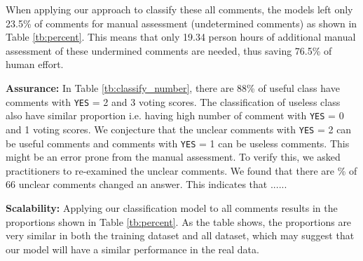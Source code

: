 When applying our approach to classify these all comments, the models left only 23.5\% of comments for manual assessment (undetermined comments) as shown in Table \ref{tb:percent}.
This means that only 19.34 person hours of additional manual assessment of these undermined comments are needed, thus saving 76.5\% of human effort.

%
%
%

\textbf{Assurance:} In Table \ref{tb:classify_number}, there are 88\% of useful class have comments with \texttt{YES} = 2 and 3 voting scores. The classification of useless class also have similar proportion i.e. having high number of comment with \texttt{YES} = 0 and 1 voting scores. We conjecture that the unclear comments with \texttt{YES} = 2 can be useful comments and comments with \texttt{YES} = 1 can be useless comments. This might be an error prone from the manual assessment. To verify this, we asked practitioners to re-examined the unclear comments. We found that there are \% of 66 unclear comments changed an answer. This indicates that ......




\textbf{Scalability:} Applying our classification model to all comments results in the proportions shown in Table \ref{tb:percent}.
As the table shows, the proportions are very similar in both the training dataset and all dataset,
which may suggest that our model will have a similar performance in the real data.

